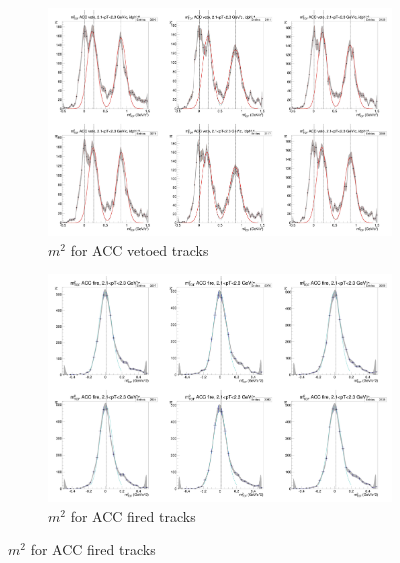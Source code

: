 \begin{figure}[H]
  \ContinuedFloat
    \begin{subfigure}{1\textwidth}
    \includegraphics[width=1\textwidth]{hiptfits/neg/PSm2_cent0_ich0_accfire0_ptbin8.jpg}
    \caption{$m^2$ for ACC vetoed tracks}
    \end{subfigure}
    \begin{subfigure}{1\textwidth}
    \includegraphics[width=1\textwidth]{hiptfits/neg/PSm2_cent0_ich0_accfire1_ptbin8.jpg}
    \caption{$m^2$ for ACC fired tracks}
    \end{subfigure}  
  \label{fig:acc21-23}
\end{figure}
